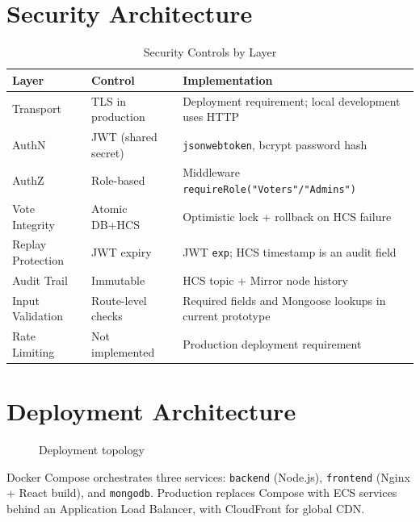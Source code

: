 \section{Security Architecture}
\label{sec:security-arch}

\begin{table}[H]
\centering
\caption{Security Controls by Layer}
\label{tab:security-controls}
\begin{tabular}{@{}lll@{}}
\toprule
\textbf{Layer} & \textbf{Control} & \textbf{Implementation} \\
\midrule
Transport & TLS in production & Deployment requirement; local development uses HTTP \\
AuthN & JWT (shared secret) & \texttt{jsonwebtoken}, bcrypt password hash \\
AuthZ & Role-based & Middleware \texttt{requireRole("Voters"/"Admins")} \\
Vote Integrity & Atomic DB+HCS & Optimistic lock + rollback on HCS failure \\
Replay Protection & JWT expiry & JWT \texttt{exp}; HCS timestamp is an audit field \\
Audit Trail & Immutable & HCS topic + Mirror node history \\
Input Validation & Route-level checks & Required fields and Mongoose lookups in current prototype \\
Rate Limiting & Not implemented & Production deployment requirement \\
\midrule
\end{tabular}
\end{table}

\section{Deployment Architecture}
\label{sec:deployment-arch}

\begin{figure}[H]
\centering
{}
\caption{Deployment topology}
\label{fig:deployment}
\end{figure}

Docker Compose orchestrates three services: \texttt{backend} (Node.js), \texttt{frontend} (Nginx + React build), and \texttt{mongodb}. Production replaces Compose with ECS services behind an Application Load Balancer, with CloudFront for global CDN.
